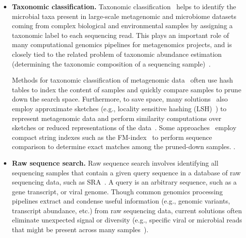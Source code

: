 \begin{itemize}[leftmargin=*]

\item \textbf{Taxonomic classification.} Taxonomic classification~\cite{wood2014kraken} helps to identify the microbial  taxa present in large-scale metagenomic and microbiome datasets coming from complex biological and environmental samples by assigning a taxonomic label to each sequencing read. This plays an important role of many computational genomics pipelines for metagenomics projects, and is closely tied to the related problem of taxonomic abundance estimation (determining the taxonomic composition of a sequencing sample)~\cite{truong2015metaphlan2,skoufos2022agamemnon,wei2022kmcp}.

Methods for taxonomic classification of metagenomic data~\cite{wood2014kraken} often use hash tables to index the \kmer content of samples and quickly compare samples to prune down the search space.
Furthermore, to save space, many solutions~\cite{wood2019improved} also employ approximate sketches (e.g., locality sensitive hashing (LSH)~\cite{roberts2004reducing}) to represent metagenomic data and perform similarity computations over sketches or reduced representations of the data~\cite{Shaw2023}.
Some approaches~\cite{kim2016centrifuge} employ compact string indexes such as the FM-index~\cite{ferragina2000opportunistic} to perform sequence comparison to determine exact matches among the pruned-down samples.  .

\item \textbf{Raw sequence search.} Raw sequence search involves identifying all sequencing samples that contain a given query sequence in a database of raw sequencing data, such as SRA~\cite{kodama2012sequence}. A query is an arbitrary sequence, such as a gene transcript, or viral genome. Though common genomics processing pipelines extract and condense useful information (e.g., genomic variants, transcript abundance, etc.) from raw sequencing data, current solutions often eliminate unexpected signal or diversity (e.g., specific viral or microbial reads that might be present across many samples~\cite{Edgar2022}). 


\end{itemize}
